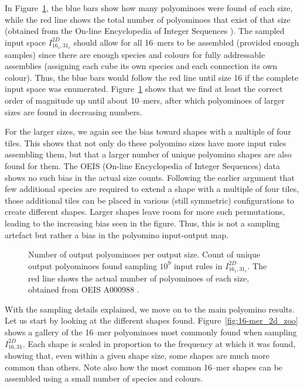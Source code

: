 In Figure~\ref{fig:ref_outputdistr}, the blue bars show how many polyominoes were found of each size, while the red line shows the total number of polyominoes that exist of that size (obtained from the On-line Encyclopedia of Integer Sequences \cite{sloane1995encyclopedia, oeisA000988}). The sampled input space \(I_{16_s,31_c}^{2D}\) should allow for all 16--mers to be assembled (provided enough samples) since there are enough species and colours for fully addressable assemblies (assigning each cube its own species and each connection its own colour). Thus, the blue bars would follow the red line until size 16 if the complete input space was enumerated. Figure~\ref{fig:ref_outputdistr} shows that we find at least the correct order of magnitude up until about 10--mers, after which polyominoes of larger sizes are found in decreasing numbers.


For the larger sizes, we again see the bias toward shapes with a multiple of four tiles. This shows that not only do these polyomino sizes have more input rules assembling them, but that a larger number of unique polyomino shapes are also found for them. The OEIS (On-line Encyclopedia of Integer Sequences) data shows no such bias in the actual size counts. Following the earlier argument that few additional species are required to extend a shape with a multiple of four tiles, those additional tiles can be placed in various (still symmetric) configurations to create different shapes. Larger shapes leave room for more such permutations, leading to the increasing bias seen in the figure. Thus, this is not a sampling artefact but rather a bias in the polyomino input-output map. 

\begin{figure}[h]
    \centering
    \caption{Number of output polyominoes per output size. Count of unique output polyominoes found sampling \(10^9\) input rules in \(I_{16_s,31_c}^{2D}\). The red line shows the actual number of polyominoes of each size, obtained from OEIS A000988 \cite{sloane1995encyclopedia, oeisA000988}.
    }
    \label{fig:ref_outputdistr}
\end{figure}

With the sampling details explained, we move on to the main polyomino results. Let us start by looking at the different shapes found. Figure~\ref{fig:16-mer_2d_zoo} shows a gallery of the 16--mer polyominoes most commonly found when sampling \(I_{16,31}^{2D}\). Each shape is scaled in proportion to the frequency at which it was found, showing that, even within a given shape size, some shapes are much more common than others. Note also how the most common 16--mer shapes can be assembled using a small number of species and colours.

